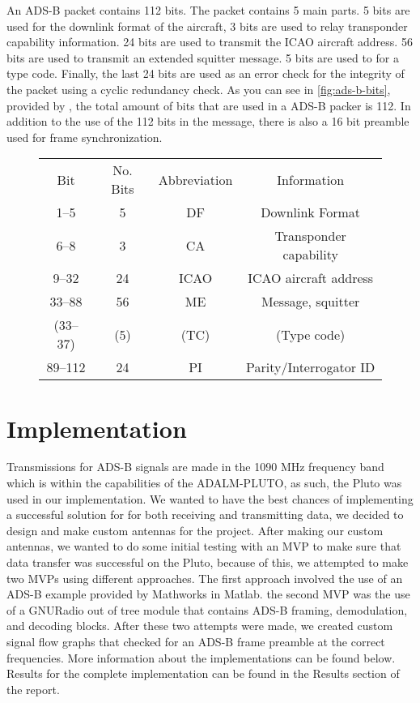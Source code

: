 \documentclass[conference]{IEEEtran}
\begin{document}
An ADS-B packet contains 112 bits. The packet contains 5 main parts. 5 bits are used for the downlink format of the aircraft, 3 bits are used to relay transponder capability information. 24 bits are used to transmit the ICAO aircraft address. 56 bits are used to transmit an extended squitter message. 5 bits are used to for a type code. Finally, the last 24 bits are used as an error check for the integrity of the packet using a cyclic redundancy check. As you can see in \autoref{fig:ads-b-bits}, provided by \cite{sun1090mhz}, the total amount of bits that are used in a ADS-B packer is 112. In addition to the use of the 112 bits in the message, there is also a 16 bit preamble used for frame synchronization.

\begin{figure}
\begin{center}
\begin{tabular}{ | c | c | c | c | }
  Bit & No. Bits & Abbreviation & Information \\ 
  1–5 & 5 & DF & Downlink Format \\
  6–8 & 3 & CA & Transponder capability \\
  9–32 & 24 & ICAO & ICAO aircraft address \\
  33–88 & 56 & ME & Message, squitter \\
  (33–37) & (5) & (TC) & (Type code) \\
  89–112 & 24 & PI & Parity/Interrogator ID
\end{tabular}
\end{center}
\caption{}\label{fig:ads-b-bits}
\end{figure}

\section{Implementation}

Transmissions for ADS-B signals are made in the 1090 MHz frequency band which is within the capabilities of the ADALM-PLUTO, as such, the Pluto was used in our implementation. 
We wanted to have the best chances of implementing a successful solution for for both receiving and transmitting data, we decided to design and make custom antennas for the project.
After making our custom antennas, we wanted to do some initial testing with an MVP to make sure that data transfer was successful on the Pluto, because of this, we attempted to make two MVPs using different approaches.
The first approach involved the use of an ADS-B example provided by Mathworks in Matlab.
the second MVP was the use of a GNURadio out of tree module that contains ADS-B framing, demodulation, and decoding blocks.
After these two attempts were made, we created custom signal flow graphs that checked for an ADS-B frame preamble at the correct frequencies.
More information about the implementations can be found below.
Results for the complete implementation can be found in the Results section of the report.
\end{document}
